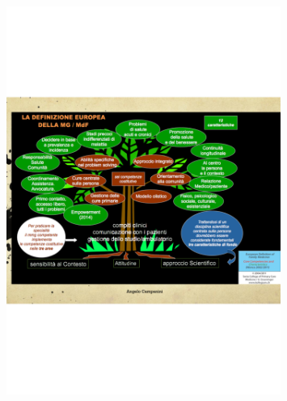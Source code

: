 \begin{figure}[!ht]
\centering
	\includegraphics[width=0.8\textwidth]{38/image8.png}
	\end{figure}
	
